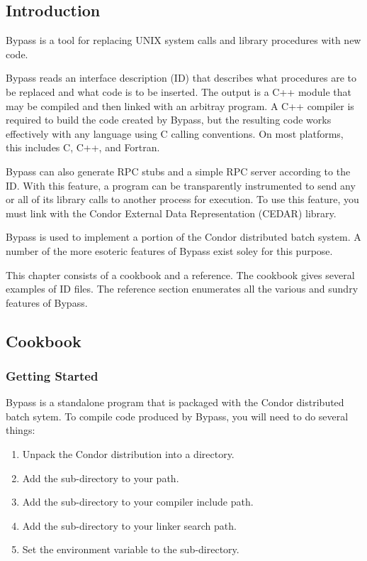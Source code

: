 
\subsection{Introduction}

Bypass is a tool for replacing UNIX system calls and library procedures with new code.

Bypass reads an interface description (ID) that describes what procedures are to be replaced and what code is to be inserted.  The output is a C++ module that may be compiled and then linked with an arbitray program.  A C++ compiler is required to build the code created by Bypass, but the resulting code works effectively with any language using C calling conventions.  On most platforms, this includes C, C++, and Fortran.

Bypass can also generate RPC stubs and a simple RPC server according to the ID.  With this feature, a program can be transparently instrumented to send any or all of its library calls to another process for execution.   To use this feature, you must link with the Condor External Data Representation (CEDAR) library.

Bypass is used to implement a portion of the Condor distributed batch system.  A number of the more esoteric features of Bypass exist soley for this purpose.

This chapter consists of a cookbook and a reference.  The cookbook gives several examples of ID files.  The reference section enumerates all the various and sundry features of Bypass.

\subsection{Cookbook}

\subsubsection{Getting Started}

Bypass is a standalone program that is packaged with the Condor distributed batch sytem.  To compile code produced by Bypass, you will need to do several things:

\begin{enumerate}
\item Unpack the Condor distribution into a directory.
\item Add the  sub-directory to your path.
\item Add the  sub-directory to your compiler include path.
\item Add the  sub-directory to your linker search path.
\item Set the environment variable  to the  sub-directory.
\end{enumerate}

